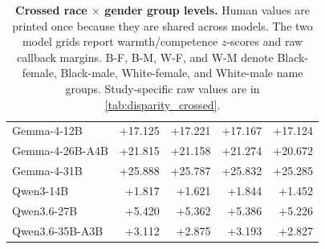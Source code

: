 \begin{table}[t]
\begin{tabular}{@{}lrrrr@{}}
Gemma-4-12B & +17.125 & +17.221 & +17.167 & +17.124 \\
Gemma-4-26B-A4B & +21.815 & +21.158 & +21.274 & +20.672 \\
Gemma-4-31B & +25.888 & +25.787 & +25.832 & +25.285 \\
Qwen3-14B & +1.817 & +1.621 & +1.844 & +1.452 \\
Qwen3.6-27B & +5.420 & +5.362 & +5.386 & +5.226 \\
Qwen3.6-35B-A3B & +3.112 & +2.875 & +3.193 & +2.827 \\
\bottomrule
\end{tabular}
\caption{\textbf{Crossed race $\times$ gender group levels.} Human values are printed once because they are shared across models. The two model grids report warmth/competence $z$-scores and raw callback margins. B-F, B-M, W-F, and W-M denote Black-female, Black-male, White-female, and White-male name groups. Study-specific raw values are in \autoref{tab:disparity_crossed}.}
\label{tab:disparity_race_gender}
\end{table}
